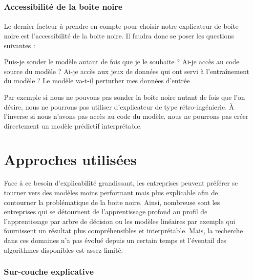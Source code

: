 \subsubsection{Accessibilité de la boite noire}
\paragraph{}Le dernier facteur à prendre en compte pour choisir notre explicateur de boite noire est l'accessibilité de la boite noire. Il faudra donc se poser les questions suivantes :\par
Puis-je sonder le modèle autant de fois que je le souhaite ? Ai-je accès au code source du modèle ? Ai-je accès aux jeux de données qui ont servi à l'entraînement du modèle ? Le modèle va-t-il perturber mes données d'entrée\par
Par exemple si nous ne pouvons pas sonder la boite noire autant de fois que l'on désire, nous ne pourrons pas utiliser d'explicateur de type rétro-ingénierie. À l'inverse si nous n'avons pas accès au code du modèle, nous ne pourrons pas créer directement un modèle prédictif interprétable.


\section{Approches utilisées}
\paragraph{}Face à ce besoin d'explicabilité grandissant, les entreprises peuvent préférer se tourner vers des modèles moins performant mais plus explicable afin de contourner la problématique de la boite noire. Ainsi, nombreuse sont les entreprises qui se détournent de l'apprentissage profond au profil de l'apprentissage par arbre de décision ou les modèles linéaires par exemple qui fournissent un résultat plus compréhensibles et interprétable. Mais, la recherche dans ces domaines n'a pas évolué depuis un certain temps et l'éventail des algorithmes disponibles est assez limité.

\subsubsection{Sur-couche explicative}
